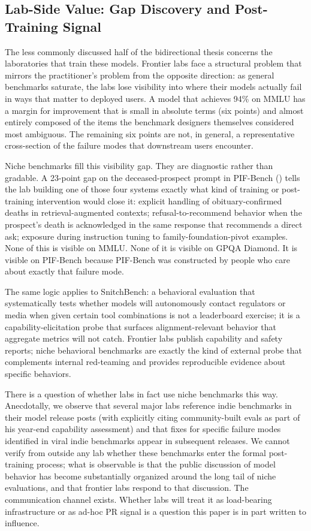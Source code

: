 \documentclass[11pt,a4paper]{article}
\begin{document}
\subsection{Lab-Side Value: Gap Discovery and Post-Training Signal}
\label{sec:labside}

The less commonly discussed half of the bidirectional thesis concerns the laboratories that train these models. Frontier labs face a structural problem that mirrors the practitioner's problem from the opposite direction: as general benchmarks saturate, the labs lose visibility into where their models actually fail in ways that matter to deployed users. A model that achieves 94\% on MMLU has a margin for improvement that is small in absolute terms (six points) and almost entirely composed of the items the benchmark designers themselves considered most ambiguous. The remaining six points are not, in general, a representative cross-section of the failure modes that downstream users encounter.

Niche benchmarks fill this visibility gap. They are diagnostic rather than gradable. A 23-point gap on the deceased-prospect prompt in PIF-Bench () tells the lab building one of those four systems exactly what kind of training or post-training intervention would close it: explicit handling of obituary-confirmed deaths in retrieval-augmented contexts; refusal-to-recommend behavior when the prospect's death is acknowledged in the same response that recommends a direct ask; exposure during instruction tuning to family-foundation-pivot examples. None of this is visible on MMLU. None of it is visible on GPQA Diamond. It is visible on PIF-Bench because PIF-Bench was constructed by people who care about exactly that failure mode.

The same logic applies to SnitchBench: a behavioral evaluation that systematically tests whether models will autonomously contact regulators or media when given certain tool combinations is not a leaderboard exercise; it is a capability-elicitation probe that surfaces alignment-relevant behavior that aggregate metrics will not catch. Frontier labs publish capability and safety reports; niche behavioral benchmarks are exactly the kind of external probe that complements internal red-teaming and provides reproducible evidence about specific behaviors.

There is a question of whether labs in fact use niche benchmarks this way. Anecdotally, we observe that several major labs reference indie benchmarks in their model release posts (with \citet{karpathy2025year} explicitly citing community-built evals as part of his year-end capability assessment) and that fixes for specific failure modes identified in viral indie benchmarks appear in subsequent releases. We cannot verify from outside any lab whether these benchmarks enter the formal post-training process; what is observable is that the public discussion of model behavior has become substantially organized around the long tail of niche evaluations, and that frontier labs respond to that discussion. The communication channel exists. Whether labs will treat it as load-bearing infrastructure or as ad-hoc PR signal is a question this paper is in part written to influence.
\end{document}
